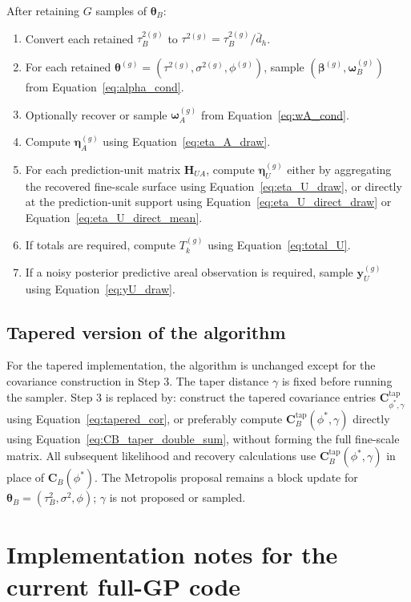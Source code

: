 \documentclass[11pt]{article}
\newcommand{\bsb}{\bm{\beta}}
\newcommand{\bsw}{\bm{\omega}}
\newcommand{\bstheta}{\bm{\theta}}
\begin{document}
After retaining $G$ samples of $\bstheta_B$:
\begin{enumerate}[leftmargin=2em]
\item Convert each retained $\tau_B^{2(g)}$ to $\tau^{2(g)}=\tau_B^{2(g)}/\bar{d}_h$.
\item For each retained $\bstheta^{(g)}=(\tau^{2(g)},\sigma^{2(g)},\phi^{(g)})$, sample $(\bsb^{(g)},\bsw_B^{(g)})$ from Equation~\eqref{eq:alpha_cond}.
\item Optionally recover or sample $\bsw_A^{(g)}$ from Equation~\eqref{eq:wA_cond}.
\item Compute $\bm{\eta}_A^{(g)}$ using Equation~\eqref{eq:eta_A_draw}.
\item For each prediction-unit matrix $\bm{H}_{UA}$, compute $\bm{\eta}_U^{(g)}$ either by aggregating the recovered fine-scale surface using Equation~\eqref{eq:eta_U_draw}, or directly at the prediction-unit support using Equation~\eqref{eq:eta_U_direct_draw} or Equation~\eqref{eq:eta_U_direct_mean}.
\item If totals are required, compute $T_k^{(g)}$ using Equation~\eqref{eq:total_U}.
\item If a noisy posterior predictive areal observation is required, sample $\bm{y}_U^{(g)}$ using Equation~\eqref{eq:yU_draw}.
\end{enumerate}

\subsection*{Tapered version of the algorithm}

For the tapered implementation, the algorithm is unchanged except for the covariance construction in Step 3. The taper distance $\gamma$ is fixed before running the sampler. Step 3 is replaced by: construct the tapered covariance entries $\bm{C}^{\mathrm{tap}}_{\phi^*,\gamma}$ using Equation~\eqref{eq:tapered_cor}, or preferably compute $\bm{C}^{\mathrm{tap}}_B(\phi^*,\gamma)$ directly using Equation~\eqref{eq:CB_taper_double_sum}, without forming the full fine-scale matrix. All subsequent likelihood and recovery calculations use $\bm{C}^{\mathrm{tap}}_B(\phi^*,\gamma)$ in place of $\bm{C}_B(\phi^*)$. The Metropolis proposal remains a block update for $\bstheta_B=(\tau_B^2,\sigma^2,\phi)$; $\gamma$ is not proposed or sampled.

\section{Implementation notes for the current full-GP code}
\end{document}
